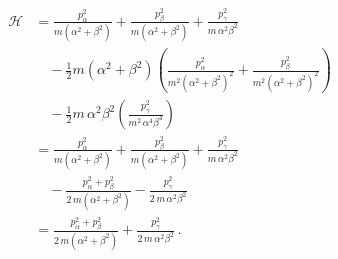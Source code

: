 \begin{equation}
\begin{aligned}
\mathcal{H}
&= \frac{p_{\alpha}^{2}}{m\left(\alpha^{2}+\beta^{2}\right)}
 + \frac{p_{\beta}^{2}}{m\left(\alpha^{2}+\beta^{2}\right)}
 + \frac{p_{\gamma}^{2}}{m\,\alpha^{2}\beta^{2}}\\
&\quad
 - \frac{1}{2}m\left(\alpha^{2}+\beta^{2}\right)
   \left(\frac{p_{\alpha}^{2}}{m^{2}\left(\alpha^{2}+\beta^{2}\right)^{2}}
       + \frac{p_{\beta}^{2}}{m^{2}\left(\alpha^{2}+\beta^{2}\right)^{2}}\right)\\
&\quad
 - \frac{1}{2}m\,\alpha^{2}\beta^{2}
   \left(\frac{p_{\gamma}^{2}}{m^{2}\,\alpha^{4}\beta^{4}}\right)\\
&= \frac{p_{\alpha}^{2}}{m\left(\alpha^{2}+\beta^{2}\right)}
 + \frac{p_{\beta}^{2}}{m\left(\alpha^{2}+\beta^{2}\right)}
 + \frac{p_{\gamma}^{2}}{m\,\alpha^{2}\beta^{2}}\\
&\quad
 - \frac{p_{\alpha}^{2}+p_{\beta}^{2}}{2\,m\left(\alpha^{2}+\beta^{2}\right)}
 - \frac{p_{\gamma}^{2}}{2\,m\,\alpha^{2}\beta^{2}}\\
&= \frac{p_{\alpha}^{2}+p_{\beta}^{2}}{2\,m\left(\alpha^{2}+\beta^{2}\right)}
 + \frac{p_{\gamma}^{2}}{2\,m\,\alpha^{2}\beta^{2}}\,.
\end{aligned}
\end{equation}
